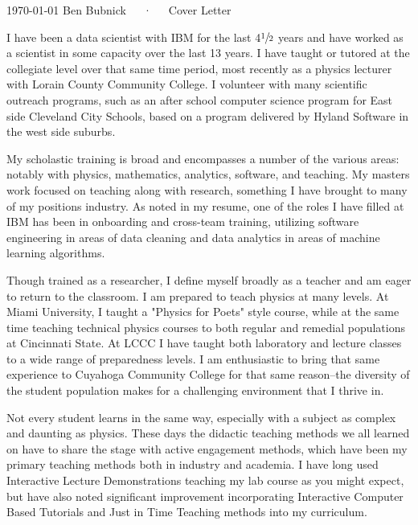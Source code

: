 \documentclass[11pt, a4paper]{awesome-cv}
\begin{document}
\makecvheader[R]

\makecvfooter
  {\today}
  {Ben Bubnick~~~·~~~Cover Letter}
  {}

\makelettertitle

\begin{cvletter}

I have been a data scientist with IBM for the last 4$\sfrac{1}{2}$ years and have worked as a scientist in some capacity over the last 13 years.  I have taught or tutored at the collegiate level over that same time period, most recently as a physics lecturer with Lorain County Community College.  I volunteer with many scientific outreach programs, such as an after school computer science program for East side Cleveland City Schools, based on a program delivered by Hyland Software in the west side suburbs.

My scholastic training is broad and encompasses a number of the various areas: notably with physics, mathematics, analytics, software, and teaching.  My masters work focused on teaching along with research, something I have brought to many of my positions industry.  As noted in my resume, one of the roles I have filled at IBM has been in onboarding and cross-team training, utilizing software engineering in areas of data cleaning and data analytics in areas of machine learning algorithms.

Though trained as a researcher, I define myself broadly as a teacher and am eager to return to the classroom. I am prepared to teach physics at many levels.  At Miami University, I taught a "Physics for Poets" style course, while at the same time teaching technical physics courses to both regular and remedial populations at Cincinnati State.  At LCCC I have taught both laboratory and lecture classes to a wide range of preparedness levels.  I am enthusiastic to bring that same experience to Cuyahoga Community College for that same reason--the diversity of the student population makes for a challenging environment that I thrive in.

Not every student learns in the same way, especially with a subject as complex and daunting as physics.  These days the didactic teaching methods we all learned on have to share the stage with active engagement methods, which have been my primary teaching methods both in industry and academia.  I have long used Interactive Lecture Demonstrations teaching my lab course as you might expect, but have also noted significant improvement incorporating Interactive Computer Based Tutorials and Just in Time Teaching methods into my curriculum.  %

\end{cvletter}


\makeletterclosing
\end{document}
